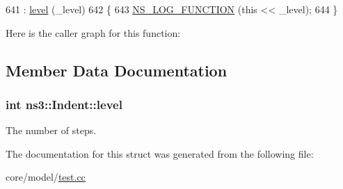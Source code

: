 \begin{DoxyCode}
641   : \hyperlink{structns3_1_1Indent_af11d23111ee1483348d0d68d6d6fe57c}{level} (\_level)
642 \{
643   \hyperlink{log-macros-disabled_8h_a90b90d5bad1f39cb1b64923ea94c0761}{NS\_LOG\_FUNCTION} (\textcolor{keyword}{this} << \_level);
644 \}
\end{DoxyCode}


Here is the caller graph for this function\+:




\subsection{Member Data Documentation}
\subsubsection[{\texorpdfstring{level}{level}}]{\setlength{\rightskip}{0pt plus 5cm}int ns3\+::\+Indent\+::level}\hypertarget{structns3_1_1Indent_af11d23111ee1483348d0d68d6d6fe57c}{}\label{structns3_1_1Indent_af11d23111ee1483348d0d68d6d6fe57c}
The number of steps. 

The documentation for this struct was generated from the following file\+:\begin{DoxyCompactItemize}
\item 
core/model/\hyperlink{test_8cc}{test.\+cc}\end{DoxyCompactItemize}
